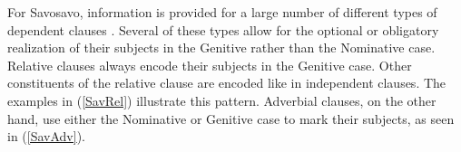 For {Savosavo}, information is provided for a large number of different types of dependent clauses \citep[254--286]{Wegener:2008}.
Several of these types allow for the optional or obligatory  realization of their subjects in the Genitive rather than the Nominative case.
Relative clauses always encode their subjects in the Genitive case. 
Other constituents of the relative clause are encoded like in independent clauses. 
The examples in (\ref{SavRel}) illustrate this pattern.
Adverbial clauses, on the other hand, use either the
Nominative  or Genitive case
to mark their subjects, as seen in (\ref{SavAdv}). 

